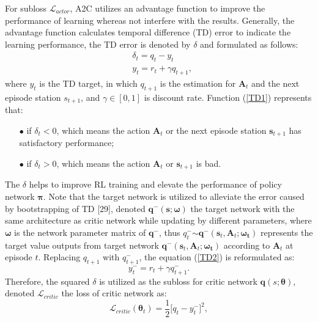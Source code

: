\documentclass{ar2rc}
\begin{document}
For subloss $\mathcal{L}_{actor}$, A2C utilizes an advantage function to improve the performance of learning whereas not interfere with the results. Generally, the advantage function calculates temporal difference (TD) error to indicate the learning performance, the TD error is denoted by $\delta$ and formulated as follows:
\begin{align}
    & \delta_t=q_t-y_t \tag{22} \label{TD1}
   \\& y_t=r_t+\gamma q_{t+1}, \tag{23} \label{TD2}
\end{align}
where $y_t$ is the TD target, in which $q_{t+1}$ is the estimation for $\mathbf{A}_t$ and the next episode station $s_{t+1}$, and $\gamma$$\in$$[0,1]$ is discount rate.
Function (\ref{TD1}) represents that:
\begin{itemize}

   \item[$\bullet$] if $\delta_t$$<$$0$, which means the action $\mathbf{A}_t$ or the next episode station $\boldsymbol{s}_{t+1}$ has satisfactory performance;

   \item[$\bullet$] if $\delta_t$$>$$0$, which means the action $\mathbf{A}_t$ or $\boldsymbol{s}_{t+1}$ is bad.

\end{itemize}
The $\delta$ helps to improve RL training and elevate the performance of policy network $\boldsymbol{\pi}$. Note that the target network is utilized to alleviate the error caused by bootstrapping of TD [29], denoted $\boldsymbol{q}^{-}\left(\boldsymbol{s};\boldsymbol{\omega}\right)$ the target network with the same architecture as critic network while updating by different parameters, where $\boldsymbol{\omega }$ is the network parameter matrix of $\boldsymbol{q}^{-}$, thus $q^-_t$$\sim $$\boldsymbol{q}^{-}\left(\boldsymbol{s}_t, \mathbf{A}_t;\boldsymbol{\omega_t}\right)$ represents the target value outputs from target network $\boldsymbol{q}^{-}\left(\boldsymbol{s}_t, \mathbf{A}_t;\boldsymbol{\omega_t}\right)$ according to $\mathbf{A}_t$ at episode $t$. Replacing $q_{t+1}$ with $q^-_{t+1}$, the equation (\ref{TD2}) is reformulated as:
\begin{equation}
   y^-_t=r_t+\gamma q^-_{t+1}. \tag{24} \label{TD3}
\end{equation}
Therefore, the squared $\delta$ is utilized as the subloss for critic network $\boldsymbol{q}\left(s;\boldsymbol{\theta}\right)$, denoted $\mathcal{L}_{critic}$ the loss of critic network as:
\begin{equation}
   \mathcal{L}_{critic}(\boldsymbol{\theta}_t) = \frac{1}{2}\Big[q_t-y^-_t\Big]^2, \tag{25}
\end{equation}
\end{document}
